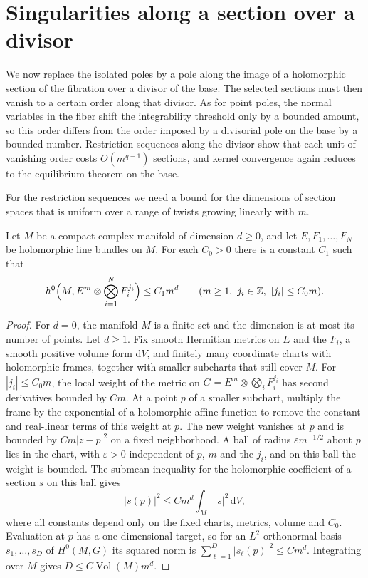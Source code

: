 \section{Singularities along a section over a divisor}
\label{sec:horizontal-center-constraints}

We now replace the isolated poles by a pole along the image of a holomorphic section of the fibration over a divisor of the base. The selected sections must then vanish to a certain order along that divisor. As for point poles, the normal variables in the fiber shift the integrability threshold only by a bounded amount, so this order differs from the order imposed by a divisorial pole on the base by a bounded number. Restriction sequences along the divisor show that each unit of vanishing order costs $O(m^{q-1})$ sections, and kernel convergence again reduces to the equilibrium theorem on the base.

For the restriction sequences we need a bound for the dimensions of section spaces that is uniform over a range of twists growing linearly with $m$.

\begin{lemma}\label{lem:linear-range-section-bound}\label{lem:finite-family-section-bound}
Let $M$ be a compact complex manifold of dimension $d\geq0$, and let $E,F_1,\ldots,F_N$ be holomorphic line bundles on $M$. For each $C_0>0$ there is a constant $C_1$ such that
\[
 h^0\Bigl(M,E^m\otimes\bigotimes_{i=1}^NF_i^{j_i}\Bigr)\leq C_1m^d
 \qquad(m\geq1,\ j_i\in\mathbb Z,\ |j_i|\leq C_0m).
\]
\end{lemma}
\begin{proof}
For $d=0$, the manifold $M$ is a finite set and the dimension is at most its number of points. Let $d\geq1$. Fix smooth Hermitian metrics on $E$ and the $F_i$, a smooth positive volume form $\mathrm{d}V$, and finitely many coordinate charts with holomorphic frames, together with smaller subcharts that still cover $M$. For $|j_i|\leq C_0m$, the local weight of the metric on $G=E^m\otimes\bigotimes_iF_i^{j_i}$ has second derivatives bounded by $Cm$. At a point $p$ of a smaller subchart, multiply the frame by the exponential of a holomorphic affine function to remove the constant and real-linear terms of this weight at $p$. The new weight vanishes at $p$ and is bounded by $Cm|z-p|^2$ on a fixed neighborhood. A ball of radius $\varepsilon m^{-1/2}$ about $p$ lies in the chart, with $\varepsilon>0$ independent of $p$, $m$ and the $j_i$, and on this ball the weight is bounded. The submean inequality for the holomorphic coefficient of a section $s$ on this ball gives
\[
 |s(p)|^2\leq Cm^d\int_M|s|^2\,\mathrm{d}V,
\]
where all constants depend only on the fixed charts, metrics, volume and $C_0$. Evaluation at $p$ has a one-dimensional target, so for an $L^2$-orthonormal basis $s_1,\ldots,s_D$ of $H^0(M,G)$ its squared norm is $\sum_{\ell=1}^D|s_\ell(p)|^2\leq Cm^d$. Integrating over $M$ gives $D\leq C\operatorname{Vol}(M)m^d$.
\end{proof}

